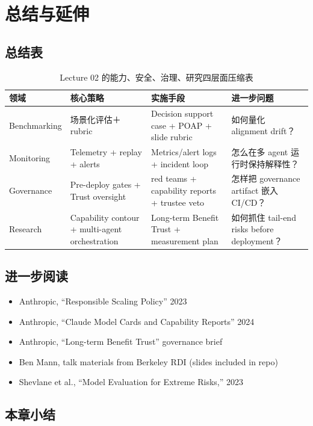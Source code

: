 \documentclass[a4paper]{article}
\begin{document}
\section{总结与延伸}

\subsection{总结表}

\begin{table}[H]
\centering
\begin{tabular}{p{} p{} p{} p{}}
\toprule
领域 & 核心策略 & 实施手段 & 进一步问题 \\
\midrule
Benchmarking & 场景化评估＋rubric & Decision support case + POAP + slide rubric & 如何量化 alignment drift？ \\
Monitoring & Telemetry + replay + alerts & Metrics/alert logs + incident loop & 怎么在多 agent 运行时保持解释性？ \\
Governance & Pre-deploy gates + Trust oversight & red teams + capability reports + trustee veto & 怎样把 governance artifact 嵌入 CI/CD？ \\
Research & Capability contour + multi-agent orchestration & Long-term Benefit Trust + measurement plan & 如何抓住 tail-end risks before deployment？ \\
\bottomrule
\end{tabular}
\caption{Lecture 02 的能力、安全、治理、研究四层面压缩表}
\end{table}

\subsection{进一步阅读}

\begin{itemize}
    \item Anthropic, ``Responsible Scaling Policy'' 2023
    \item Anthropic, ``Claude Model Cards and Capability Reports'' 2024
    \item Anthropic, ``Long-term Benefit Trust'' governance brief
    \item Ben Mann, talk materials from Berkeley RDI (slides included in repo)
    \item Shevlane et al., ``Model Evaluation for Extreme Risks,'' 2023
\end{itemize}

\subsection{本章小结}
\end{document}

